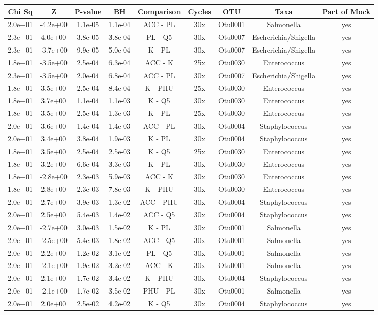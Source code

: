 \documentclass[11pt,]{article}
\begin{document}
\begin{longtable}[]{@{}ccccccccc@{}}
\toprule
Chi Sq & Z & P-value & BH & Comparison & Cycles & OTU & Taxa & Part of
Mock\tabularnewline
\midrule
\endhead
2.0e+01 & -4.2e+00 & 1.1e-05 & 1.1e-04 & ACC - PL & 30x & Otu0001 &
Salmonella & yes\tabularnewline
2.3e+01 & 4.0e+00 & 3.8e-05 & 3.8e-04 & PL - Q5 & 30x & Otu0007 &
Escherichia/Shigella & yes\tabularnewline
2.3e+01 & -3.7e+00 & 9.9e-05 & 5.0e-04 & K - PL & 30x & Otu0007 &
Escherichia/Shigella & yes\tabularnewline
1.8e+01 & -3.5e+00 & 2.5e-04 & 6.3e-04 & ACC - K & 25x & Otu0030 &
Enterococcus & yes\tabularnewline
2.3e+01 & -3.5e+00 & 2.0e-04 & 6.8e-04 & ACC - PL & 30x & Otu0007 &
Escherichia/Shigella & yes\tabularnewline
1.8e+01 & 3.5e+00 & 2.5e-04 & 8.4e-04 & K - PHU & 25x & Otu0030 &
Enterococcus & yes\tabularnewline
1.8e+01 & 3.7e+00 & 1.1e-04 & 1.1e-03 & K - Q5 & 30x & Otu0030 &
Enterococcus & yes\tabularnewline
1.8e+01 & 3.5e+00 & 2.5e-04 & 1.3e-03 & K - PL & 25x & Otu0030 &
Enterococcus & yes\tabularnewline
2.0e+01 & 3.6e+00 & 1.4e-04 & 1.4e-03 & ACC - PL & 30x & Otu0004 &
Staphylococcus & yes\tabularnewline
2.0e+01 & 3.4e+00 & 3.8e-04 & 1.9e-03 & K - PL & 30x & Otu0004 &
Staphylococcus & yes\tabularnewline
1.8e+01 & 3.5e+00 & 2.5e-04 & 2.5e-03 & K - Q5 & 25x & Otu0030 &
Enterococcus & yes\tabularnewline
1.8e+01 & 3.2e+00 & 6.6e-04 & 3.3e-03 & K - PL & 30x & Otu0030 &
Enterococcus & yes\tabularnewline
1.8e+01 & -2.8e+00 & 2.3e-03 & 5.9e-03 & ACC - K & 30x & Otu0030 &
Enterococcus & yes\tabularnewline
1.8e+01 & 2.8e+00 & 2.3e-03 & 7.8e-03 & K - PHU & 30x & Otu0030 &
Enterococcus & yes\tabularnewline
2.0e+01 & 2.7e+00 & 3.9e-03 & 1.3e-02 & ACC - PHU & 30x & Otu0004 &
Staphylococcus & yes\tabularnewline
2.0e+01 & 2.5e+00 & 5.4e-03 & 1.4e-02 & ACC - Q5 & 30x & Otu0004 &
Staphylococcus & yes\tabularnewline
2.0e+01 & -2.7e+00 & 3.0e-03 & 1.5e-02 & K - PL & 30x & Otu0001 &
Salmonella & yes\tabularnewline
2.0e+01 & -2.5e+00 & 5.4e-03 & 1.8e-02 & ACC - Q5 & 30x & Otu0001 &
Salmonella & yes\tabularnewline
2.0e+01 & 2.2e+00 & 1.2e-02 & 3.1e-02 & PL - Q5 & 30x & Otu0001 &
Salmonella & yes\tabularnewline
2.0e+01 & -2.1e+00 & 1.9e-02 & 3.2e-02 & ACC - K & 30x & Otu0001 &
Salmonella & yes\tabularnewline
2.0e+01 & 2.1e+00 & 1.7e-02 & 3.4e-02 & K - PHU & 30x & Otu0004 &
Staphylococcus & yes\tabularnewline
2.0e+01 & -2.1e+00 & 1.7e-02 & 3.5e-02 & PHU - PL & 30x & Otu0001 &
Salmonella & yes\tabularnewline
2.0e+01 & 2.0e+00 & 2.5e-02 & 4.2e-02 & K - Q5 & 30x & Otu0004 &
Staphylococcus & yes\tabularnewline
\bottomrule
\end{longtable}
\end{document}
